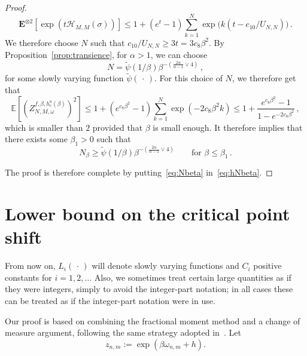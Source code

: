 \documentclass[10pt]{amsart}
\theoremstyle{definition}\newtheorem{defi}[theo]{Definition}\newtheorem{rema}[theo]{Remark}\newtheorem{exam}[theo]{Example}\newtheorem{exem}[theo]{Example}\newtheorem{nota}[theo]{Notation}
\newcommand{\ga}{\alpha}
\newcommand{\gb}{\beta}
\renewcommand{\tilde}{\widetilde}
\newcommand{\cH}{\ensuremath{\mathcal{H}}}
\newcommand{\bE}{\ensuremath{\mathbf{E}}}
\newcommand{\bbE}{\ensuremath{\mathbb{E}}}
\begin{document}
\begin{proof}
\begin{equation}
\bE^{\otimes 2} \left[\exp (t \cH_{M,M}(\sigma)) \right] \le 1 + (e^{t}-1) \sum_{k=1}^N \exp \Big(k (t - c_{10}/U_{N,N}) \Big)\,.
\end{equation}
We therefore choose $N$ such that $ c_{10}/U_{N,N} \ge 3 t = 3c_{8} \gb^2 $. By Proposition~\ref{prop:transience}, for $\ga >1$, we can choose
\begin{equation}
N =
\tilde \psi (1/\gb) \gb^{- (\frac{2\ga}{\ga-1} \vee 4)}\,,
\end{equation}
for some slowly varying function $\tilde\psi({\,\cdot\,})$. For this choice of $N$, we therefore get that
\begin{equation}
\bbE \left[\left(Z^{f,\beta,h_c^a(\beta)}_{N,M,\omega} \right)^2 \right] \le 1 + (e^{c_8 \beta^2} -1) \sum_{k=1}^N \exp(- 2 c_8 \beta^2 k) \le 1 + \frac{e^{c_8 \gb^2} -1}{1- e^{-2 c_8 \gb^2}}\,,
\end{equation}
which is smaller than $2$ provided that $\gb$ is small enough. It therefore implies that there exists some $\gb_1>0$ such that
\begin{equation}\label{eq:Nbeta}
N_\beta \ge
\tilde \psi (1/\gb) \gb^{- (\frac{2\ga}{\ga-1} \vee 4)} \qquad \text{for } \gb \leq \gb_1\,.
\end{equation}

The proof is therefore complete by putting~\eqref{eq:Nbeta} in~\eqref{eq:hNbeta}.
\end{proof}


\section{Lower bound on the critical point shift}\label{sec:fm}

From now on, $L_i({\,\cdot\,})$ will denote slowly varying functions and $C_i$ positive constants for $i=1,2,\dots$ Also, we sometimes treat certain large quantities as if they were integers, simply to avoid the integer-part notation; in all cases these can be treated as if the integer-part notation were in use.

Our proof is based on combining the fractional moment method and a change of measure argument, following the same strategy adopted in~\cite{cf:DGLT09}. Let
\begin{equation}
z_{n,m} := \exp \left(\beta \omega_{n,m} + h \right).
\end{equation}
\end{document}
